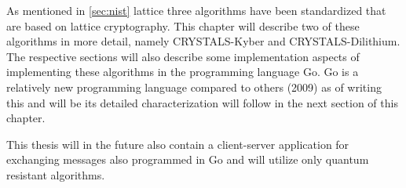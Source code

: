 As mentioned in \ref{sec:nist} lattice three algorithms have been standardized that are based on lattice cryptography. This chapter will describe two of these algorithms in more detail, namely CRYSTALS-Kyber and CRYSTALS-Dilithium. The respective sections will also describe some implementation aspects of implementing these algorithms in the programming language Go. Go is a relatively new programming language compared to others (2009) as of writing this \cite{Donovan2016} and will be its detailed characterization will follow in the next section of this chapter.

This thesis will in the future also contain a client-server application for exchanging messages also programmed in Go and will utilize only quantum resistant algorithms.
